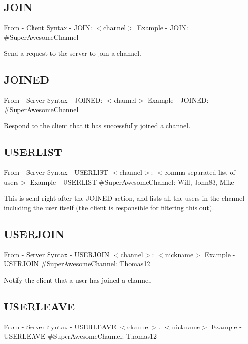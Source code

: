 \documentclass[12pt]{rapport}
\begin{document}
\subsection*{JOIN}
From    - Client\newline
Syntax  - JOIN: $<$channel$>$\newline
Example - JOIN: \#SuperAwesomeChannel\newline

\noindent Send a request to the server to join a channel.

\subsection*{JOINED}
From    - Server\newline
Syntax  - JOINED: $<$channel$>$\newline
Example - JOINED: \#SuperAwesomeChannel\newline

\noindent Respond to the client that it has successfully joined a channel.

\subsection*{USERLIST}
From    - Server\newline
Syntax  - USERLIST $<$channel$>$: $<$comma separated list of users$>$\newline
Example - USERLIST \#SuperAwesomeChannel: Will, John83, Mike\newline

\noindent This is send right after the JOINED action, and lists all the users in the channel including the user itself (the client is responsible for filtering this out).

\subsection*{USERJOIN}
From    - Server\newline
Syntax  - USERJOIN $<$channel$>$: $<$nickname$>$\newline
Example - USERJOIN \#SuperAwesomeChannel: Thomas12\newline

\noindent Notify the client that a user has joined a channel.

\subsection*{USERLEAVE}
From    - Server\newline
Syntax  - USERLEAVE $<$channel$>$: $<$nickname$>$\newline
Example - USERLEAVE \#SuperAwesomeChannel: Thomas12\newline
\end{document}
